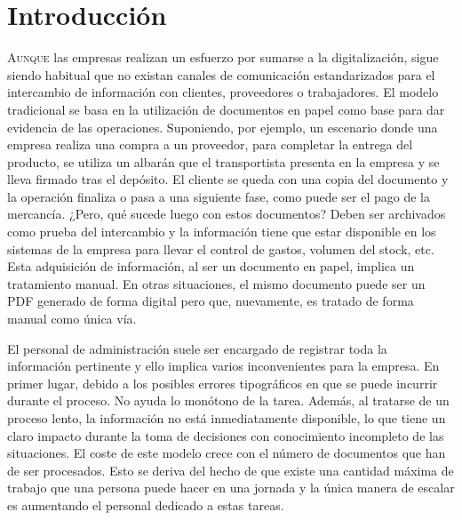 

\chapter{Introducción}
\label{chap:introduccion}

\lettrine{A}{unque} las empresas realizan un esfuerzo por sumarse a la digitalización, sigue siendo habitual que no existan canales de comunicación estandarizados para el intercambio de información con clientes, proveedores o trabajadores. El modelo tradicional se basa en la utilización de documentos en papel como base para dar evidencia de las operaciones. Suponiendo, por ejemplo, un escenario donde una empresa realiza una compra a un proveedor, para completar la entrega del producto, se utiliza un albarán que el transportista presenta en la empresa y se lleva firmado tras el depósito. El cliente se queda con una copia del documento y la operación finaliza o pasa a una siguiente fase, como puede ser el pago de la mercancía. ¿Pero, qué sucede luego con estos documentos? Deben ser archivados como prueba del intercambio y la información tiene que estar disponible en los sistemas de la empresa para llevar el control de gastos, volumen del stock, etc. Esta adquisición de información, al ser un documento en papel, implica un tratamiento manual. En otras situaciones, el mismo documento puede ser un PDF generado de forma digital pero que, nuevamente, es tratado de forma manual como única vía.

El personal de administración suele ser encargado de registrar toda la información pertinente y ello implica varios inconvenientes para la empresa. En primer lugar, debido a los posibles errores tipográficos en que se puede incurrir durante el proceso. No ayuda lo monótono de la tarea. Además, al tratarse de un proceso lento, la información no está inmediatamente disponible, lo que tiene un claro impacto durante la toma de decisiones con conocimiento incompleto de las situaciones. El coste de este modelo crece con el número de documentos que han de ser procesados. Esto se deriva del hecho de que existe una cantidad máxima de trabajo que una persona puede hacer en una jornada y la única manera de escalar es aumentando el personal dedicado a estas tareas.

